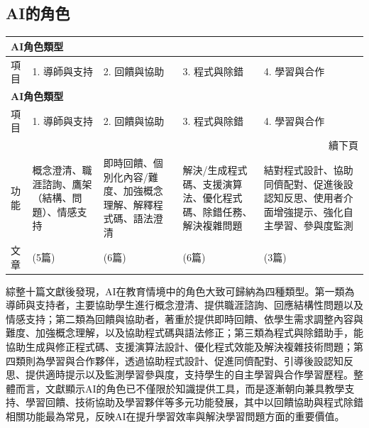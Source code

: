 \subsection{AI的角色}\label{sec:AI角色}

\begingroup
\small
\setlength{\tabcolsep}{3pt}
\begin{longtable}{@{}p{} p{} p{} p{} p{}@{}}
\toprule
\multicolumn{5}{l}{\textbf{AI角色類型}} \\
\midrule
項目 & 1. 導師與支持 & 2. 回饋與協助 & 3. 程式與除錯 & 4. 學習與合作 \\
\midrule
\endfirsthead
\toprule
\multicolumn{5}{l}{\textbf{AI角色類型}} \\
\midrule
項目 & 1. 導師與支持 & 2. 回饋與協助 & 3. 程式與除錯 & 4. 學習與合作 \\
\midrule
\endhead
\midrule
\multicolumn{5}{r}{續下頁} \\
\endfoot
\bottomrule
\endlastfoot
功能 & 概念澄清、職涯諮詢、鷹架（結構、問題）、情感支持 & 即時回饋、個別化內容/難度、加強概念理解、解釋程式碼、語法澄清 & 解決/生成程式碼、支援演算法、優化程式碼、除錯任務、解決複雜問題 & 結對程式設計、協助同儕配對、促進後設認知反思、使用者介面增強提示、強化自主學習、參與度監測 \\
文章 & \cite{cao2023chatbots,yan2025llm,kohen2025integrating,tang2025enhancing,cubillos2025generative} (5篇) & \cite{fan2025pair,llerena2024introductory,omeh2025pbl,kohen2025integrating,yang2025chatgpt,tang2025enhancing} (6篇) & \cite{fan2025pair,groothuijsen2024chatbots,llerena2024introductory,omeh2025pbl,kohen2025integrating,yang2025chatgpt} (6篇) & \cite{fan2025pair,omeh2025pbl,kohen2025integrating} (3篇) \\
\end{longtable}
\endgroup

綜整十篇文獻後發現，AI在教育情境中的角色大致可歸納為四種類型。第一類為導師與支持者，主要協助學生進行概念澄清、提供職涯諮詢、回應結構性問題以及情感支持；第二類為回饋與協助者，著重於提供即時回饋、依學生需求調整內容與難度、加強概念理解，以及協助程式碼與語法修正；第三類為程式與除錯助手，能協助生成與修正程式碼、支援演算法設計、優化程式效能及解決複雜技術問題；第四類則為學習與合作夥伴，透過協助程式設計、促進同儕配對、引導後設認知反思、提供適時提示以及監測學習參與度，支持學生的自主學習與合作學習歷程。整體而言，文獻顯示AI的角色已不僅限於知識提供工具，而是逐漸朝向兼具教學支持、學習回饋、技術協助及學習夥伴等多元功能發展，其中以回饋協助與程式除錯相關功能最為常見，反映AI在提升學習效率與解決學習問題方面的重要價值。

